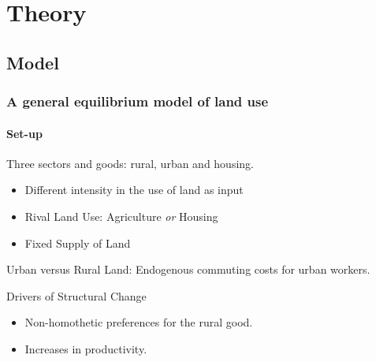 \documentclass[aspectratio=169]{beamer}
\begin{document}

\section{Theory}
\subsection{Model}
\begin{frame}
\frametitle{A general equilibrium model of land use}
\framesubtitle{Set-up}

\begin{midi}
\item Three sectors and goods: rural, urban and housing.
\begin{itemize}
	\item Different intensity in the use of land as input
	\item Rival Land Use: Agriculture \emph{or} Housing
	\item Fixed Supply of Land
\end{itemize}

\item Urban versus Rural Land: Endogenous commuting costs for urban workers.

\item Drivers of Structural Change
\begin{itemize}
	\item Non-homothetic preferences for the rural good.
	\item Increases in productivity.
\end{itemize}
\end{midi}
\end{frame}

\end{document}
